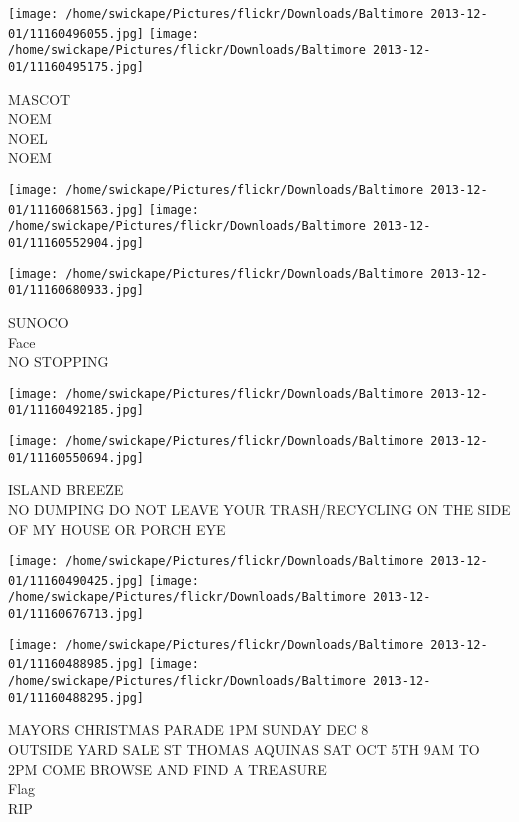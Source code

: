 \documentclass[10pt,letterpaper]{article}
\begin{document}
\texttt{[image: /home/swickape/Pictures/flickr/Downloads/Baltimore 2013-12-01/11160496055.jpg]}
\texttt{[image: /home/swickape/Pictures/flickr/Downloads/Baltimore 2013-12-01/11160495175.jpg]}

MASCOT\\
NOEM\\
NOEL\\
NOEM\\
\pagebreak

\texttt{[image: /home/swickape/Pictures/flickr/Downloads/Baltimore 2013-12-01/11160681563.jpg]}
\texttt{[image: /home/swickape/Pictures/flickr/Downloads/Baltimore 2013-12-01/11160552904.jpg]}

\texttt{[image: /home/swickape/Pictures/flickr/Downloads/Baltimore 2013-12-01/11160680933.jpg]}

SUNOCO\\
Face\\
NO STOPPING\\
\pagebreak

\texttt{[image: /home/swickape/Pictures/flickr/Downloads/Baltimore 2013-12-01/11160492185.jpg]}

\vspace{0.25in}
\texttt{[image: /home/swickape/Pictures/flickr/Downloads/Baltimore 2013-12-01/11160550694.jpg]}

ISLAND BREEZE\\
NO DUMPING DO NOT LEAVE YOUR TRASH/RECYCLING ON THE SIDE OF MY HOUSE OR PORCH EYE\\
\pagebreak

\texttt{[image: /home/swickape/Pictures/flickr/Downloads/Baltimore 2013-12-01/11160490425.jpg]}
\texttt{[image: /home/swickape/Pictures/flickr/Downloads/Baltimore 2013-12-01/11160676713.jpg]}

\texttt{[image: /home/swickape/Pictures/flickr/Downloads/Baltimore 2013-12-01/11160488985.jpg]}
\texttt{[image: /home/swickape/Pictures/flickr/Downloads/Baltimore 2013-12-01/11160488295.jpg]}

MAYORS CHRISTMAS PARADE 1PM SUNDAY DEC 8\\
OUTSIDE YARD SALE ST THOMAS AQUINAS SAT OCT 5TH 9AM TO 2PM COME BROWSE AND FIND A TREASURE\\
Flag\\
RIP\\
\pagebreak
\end{document}
